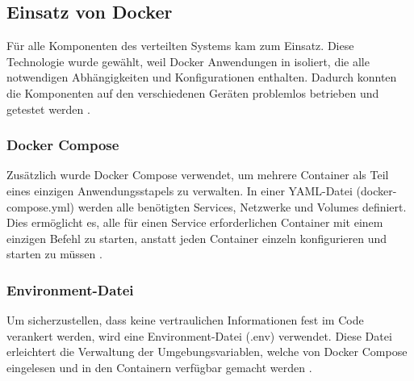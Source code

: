 \subsection{Einsatz von Docker}

Für alle Komponenten des verteilten Systems kam  zum Einsatz. Diese Technologie wurde gewählt, weil Docker Anwendungen in   isoliert, die alle notwendigen Abhängigkeiten und Konfigurationen enthalten. Dadurch konnten die Komponenten auf  den verschiedenen Geräten problemlos betrieben und getestet werden \cite{Aerisdocker}.

\subsubsection{Docker Compose}

Zusätzlich wurde Docker Compose verwendet, um mehrere Container als Teil eines einzigen Anwendungsstapels zu verwalten. In einer YAML-Datei (docker-compose.yml) werden alle benötigten Services, Netzwerke und Volumes definiert. Dies ermöglicht es, alle für einen Service erforderlichen Container mit einem einzigen Befehl zu starten, anstatt jeden Container einzeln konfigurieren und starten zu müssen \cite{DockerCompose}.

\subsubsection{Environment-Datei}

Um sicherzustellen, dass keine vertraulichen Informationen fest im Code verankert werden, wird eine Environment-Datei (.env) verwendet. Diese Datei erleichtert die Verwaltung der Umgebungsvariablen, welche von Docker Compose eingelesen und in den Containern verfügbar gemacht werden \cite{DockerEnv}.
